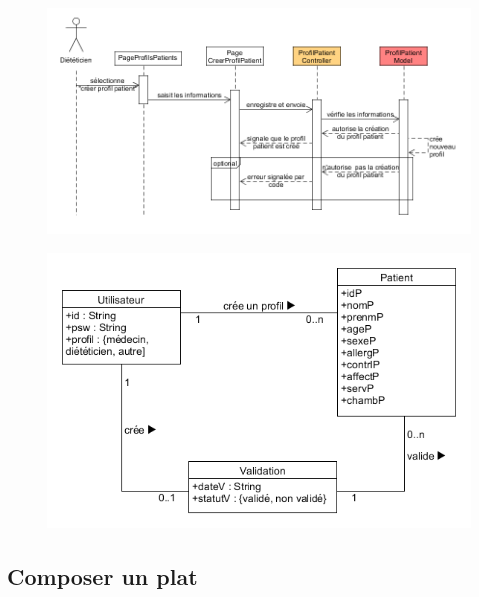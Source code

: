 \documentclass{beamer}
\begin{document}
\begin{frame}[plain]{}
\begin{figure}
\centering
\includegraphics[scale=0.4]{../CasDUtilisations/ProfilPatient/diagSrqDetaillProfilPatient.png}
\end{figure}
\end{frame}

\begin{frame}[plain]{}
\begin{figure}
\centering
\includegraphics[scale=0.5]{../CasDUtilisations/ProfilPatient/diagclassProfilPatient.png}
\end{figure}
\end{frame}

\subsection{Composer un plat}
\end{document}
